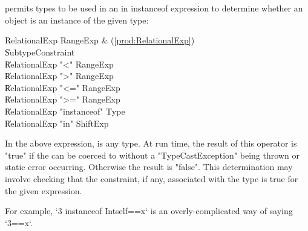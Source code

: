



\section{}
\label{instanceOf}

\Xten{} permits types to be used in an in instanceof expression
to determine whether an object is an instance of the given type:

\begin{bbgrammar}
       RelationalExp \: RangeExp & (\ref{prod:RelationalExp}) \\
                    \| SubtypeConstraint \\
                    \| RelationalExp \xcd"<" RangeExp \\
                    \| RelationalExp \xcd">" RangeExp \\
                    \| RelationalExp \xcd"<=" RangeExp \\
                    \| RelationalExp \xcd">=" RangeExp \\
                    \| RelationalExp \xcd"instanceof" Type \\
                    \| RelationalExp \xcd"in" ShiftExp \\
\end{bbgrammar}

In the above expression,  is any type. At run time, the
result of this operator is \xcd"true" if the
 can be coerced to 
without a \xcd"TypeCastException" being thrown or static error occurring.
Otherwise the result is \xcd"false". This determination may involve checking
that the constraint, if any, associated with the type is true for the given
expression.

For example, \xcd`3 instanceof Int{self==x}` is an overly-complicated way of
saying \xcd`3==x`.


